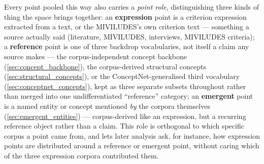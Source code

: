 Every point pooled this way also carries a \textit{point role}, distinguishing three kinds of thing the space brings together: an \textbf{expression} point is a criterion expression extracted from a text, or the MIVILUDES's own criterion text — something a source actually said (literature, MIVILUDES, interviews, MIVILUDES criteria); a \textbf{reference} point is one of three backdrop vocabularies, not itself a claim any source makes — the corpus-independent concept backbone (\ref{sec:concept_backbone}), the corpus-derived structural concepts (\ref{sec:structural_concepts}), or the ConceptNet-generalised third vocabulary (\ref{sec:conceptnet_concepts}), kept as three separate subsets throughout rather than merged into one undifferentiated \enquote{reference} category; an \textbf{emergent} point is a named entity or concept mentioned \textit{by} the corpora themselves (\ref{sec:emergent_entities}) — corpus-derived like an expression, but a recurring reference object rather than a claim. This role is orthogonal to which specific corpus a point came from, and lets later analysis ask, for instance, how expression points are distributed around a reference or emergent point, without caring which of the three expression corpora contributed them.


